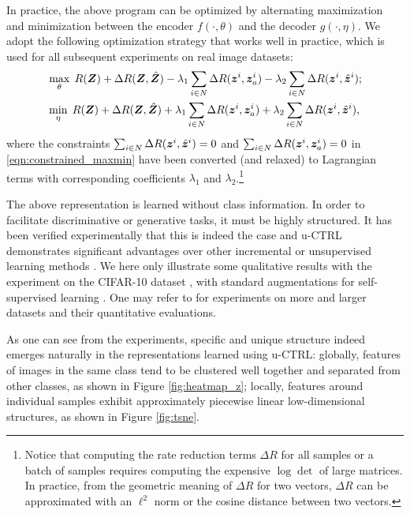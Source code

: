 \documentclass[../../book-main.tex]{subfiles}
\begin{document}
In practice, the above program can be optimized by alternating maximization and minimization between the encoder $f(\cdot,\theta)$ and the decoder $g(\cdot,\eta)$. We adopt the following optimization strategy that works well in practice, which is used for all subsequent experiments on real image datasets:
\vspace{-1mm}
\begin{align}
  &  \max_{\theta}\; R(\bm{Z}) + \Delta{R(\bm{Z}, \hat{\bm{Z}})-\lambda_{1}\sum_{i\in N} \Delta R(\bm{z}^i, \bm{z}_{a}^i)} -\lambda_{2}\sum_{i\in N} \Delta R(\bm{z}^i, \hat{\bm{z}}^i) \label{eqn:constrained_max}; \\
   & \min_{\eta}\; R(\bm{Z}) + \Delta{R(\bm{Z}, \hat{\bm{Z}})+\lambda_{1}\sum_{i\in N} \Delta R(\bm{z}^i, \bm{z}_{a}^i)+ \lambda_{2}\sum_{i\in N} \Delta R(\bm{z}^i, \hat{\bm{z}}^i)} \label{eqn:constrained_min}, 
\end{align}
where the constraints $\sum_{i\in N} \Delta R(\bm{z}^i, \hat{\bm{z}}^i) = 0$ and $\sum_{i\in N} \Delta R(\bm{z}^i, \bm{z}_{a}^i) = 0$ in \eqref{eqn:constrained_maxmin} have been converted (and relaxed) to Lagrangian terms with corresponding coefficients $\lambda_{1}$ and  $\lambda_{2}$.\footnote{Notice that computing the rate reduction terms $\Delta R$ for all samples or a batch of samples requires computing the expensive $\log\det$ of large matrices. In practice, from the geometric meaning of $\Delta R$ for two vectors, $\Delta R$ can be approximated with an $\ell^2$ norm or the cosine distance between two vectors.}

The above representation is learned without class information. In order to facilitate discriminative or generative tasks, it must be highly structured. It has been verified experimentally that this is indeed the case and u-CTRL demonstrates significant advantages over other incremental or unsupervised learning methods \cite{pmlr-v234-tong24a}. We here only illustrate some qualitative results with the experiment on the CIFAR-10 dataset \cite{krizhevsky2014cifar}, with standard augmentations for self-supervised learning \cite{chen2020simple}. One may refer to \cite{pmlr-v234-tong24a} for experiments on more and larger datasets and their quantitative evaluations. 

As one can see from the experiments, specific and unique structure indeed emerges naturally in the representations learned using u-CTRL: globally, features of images in the same class tend to be clustered well together and separated from other classes, as shown in Figure \ref{fig:heatmap_z}; locally, features around individual samples exhibit approximately piecewise linear low-dimensional structures, as shown in Figure \ref{fig:tsne}. 
\end{document}
